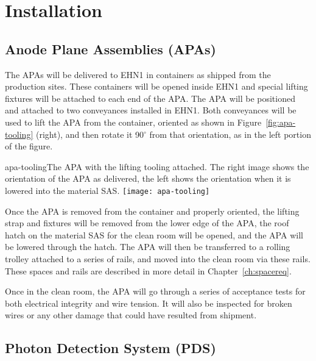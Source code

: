 
\section{Installation}


\subsection{Anode Plane Assemblies (APAs)}

The APAs will be delivered to EHN1 in containers as shipped from the production sites.  These containers will be opened inside EHN1 and special lifting fixtures will be attached to each end of the APA.  The APA will be positioned and attached to two conveyances installed in EHN1.  Both conveyances will be used to lift the APA from the container, oriented as shown in Figure~\ref{fig:apa-tooling} (right), and then rotate it 90$^\circ$ from that orientation, as in the left portion of the figure.

\begin{cdrfigure}{apa-tooling}{The APA with the lifting tooling attached.  The right image shows the orientation of the APA as delivered, the left shows the orientation when it is lowered into the material SAS. }
\texttt{[image: apa-tooling]}
\end{cdrfigure}

Once the APA is removed from the container and properly oriented, the lifting strap and fixtures will be removed from the lower edge of the APA, the roof hatch on the material SAS for 
 the clean room will be opened, and the APA will be lowered through the hatch.  The APA will then be transferred to a rolling trolley attached to a series of rails, and moved into the clean room via these rails.  These spaces and rails are described in more detail in Chapter~\ref{ch:spacereq}. 

Once in the clean room, the APA will go through a series of acceptance tests for both electrical integrity and wire tension.  It will also be inspected for broken wires or any other damage that could have resulted from shipment.  

\subsection{Photon Detection System (PDS)}

